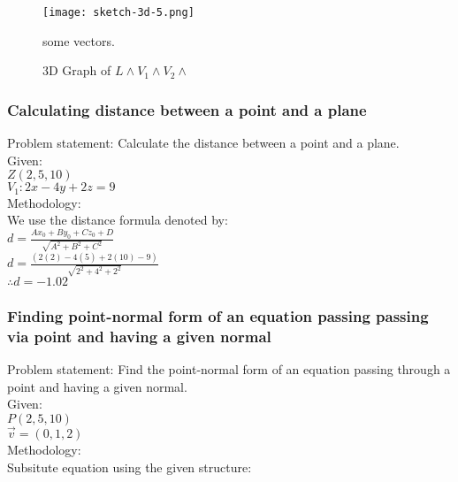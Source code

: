 \begin{figure}[H]
\centering
\texttt{[image: sketch-3d-5.png]}
\caption{3D Graph of $L \land V_1 \land V_2 \land $} some vectors.
\label{fig:Plane_3D_worked_5}
\end{figure}

\subsubsection{Calculating distance between a point and a plane}

Problem statement: Calculate the distance between a point and a plane. \\

Given: \\

$Z(2,5,10)$ \\

$V_1: 2x-4y+2z=9$ \\

Methodology: \\

We use the distance formula denoted by: \\

$d = \frac{Ax_0+By_0+Cz_0+D}{\sqrt{A^2+B^2+C^2}}$ \\

$d = \frac{(2(2)-4(5)+2(10)-9)}{\sqrt{2^2+4^2+2^2}}$ \\

$\therefore d = -1.02$ \\

\subsubsection{Finding point-normal form of an equation passing passing via point and having a given normal}

Problem statement: Find the point-normal form of an equation passing through a point and having a given normal. \\

Given: \\

$P(2,5,10)$ \\

$\vec{v}  = (0,1,2)$ \\

Methodology: \\ 

Subsitute equation using the given structure: \\

